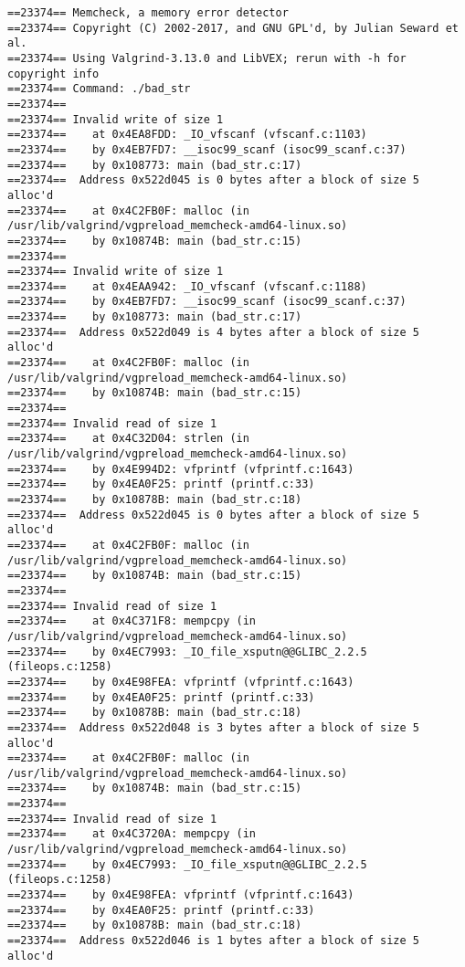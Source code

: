 \documentclass[11pt]{article}
\begin{document}
\begin{verbatim}
==23374== Memcheck, a memory error detector
==23374== Copyright (C) 2002-2017, and GNU GPL'd, by Julian Seward et al.
==23374== Using Valgrind-3.13.0 and LibVEX; rerun with -h for copyright info
==23374== Command: ./bad_str
==23374== 
==23374== Invalid write of size 1
==23374==    at 0x4EA8FDD: _IO_vfscanf (vfscanf.c:1103)
==23374==    by 0x4EB7FD7: __isoc99_scanf (isoc99_scanf.c:37)
==23374==    by 0x108773: main (bad_str.c:17)
==23374==  Address 0x522d045 is 0 bytes after a block of size 5 alloc'd
==23374==    at 0x4C2FB0F: malloc (in /usr/lib/valgrind/vgpreload_memcheck-amd64-linux.so)
==23374==    by 0x10874B: main (bad_str.c:15)
==23374== 
==23374== Invalid write of size 1
==23374==    at 0x4EAA942: _IO_vfscanf (vfscanf.c:1188)
==23374==    by 0x4EB7FD7: __isoc99_scanf (isoc99_scanf.c:37)
==23374==    by 0x108773: main (bad_str.c:17)
==23374==  Address 0x522d049 is 4 bytes after a block of size 5 alloc'd
==23374==    at 0x4C2FB0F: malloc (in /usr/lib/valgrind/vgpreload_memcheck-amd64-linux.so)
==23374==    by 0x10874B: main (bad_str.c:15)
==23374== 
==23374== Invalid read of size 1
==23374==    at 0x4C32D04: strlen (in /usr/lib/valgrind/vgpreload_memcheck-amd64-linux.so)
==23374==    by 0x4E994D2: vfprintf (vfprintf.c:1643)
==23374==    by 0x4EA0F25: printf (printf.c:33)
==23374==    by 0x10878B: main (bad_str.c:18)
==23374==  Address 0x522d045 is 0 bytes after a block of size 5 alloc'd
==23374==    at 0x4C2FB0F: malloc (in /usr/lib/valgrind/vgpreload_memcheck-amd64-linux.so)
==23374==    by 0x10874B: main (bad_str.c:15)
==23374== 
==23374== Invalid read of size 1
==23374==    at 0x4C371F8: mempcpy (in /usr/lib/valgrind/vgpreload_memcheck-amd64-linux.so)
==23374==    by 0x4EC7993: _IO_file_xsputn@@GLIBC_2.2.5 (fileops.c:1258)
==23374==    by 0x4E98FEA: vfprintf (vfprintf.c:1643)
==23374==    by 0x4EA0F25: printf (printf.c:33)
==23374==    by 0x10878B: main (bad_str.c:18)
==23374==  Address 0x522d048 is 3 bytes after a block of size 5 alloc'd
==23374==    at 0x4C2FB0F: malloc (in /usr/lib/valgrind/vgpreload_memcheck-amd64-linux.so)
==23374==    by 0x10874B: main (bad_str.c:15)
==23374== 
==23374== Invalid read of size 1
==23374==    at 0x4C3720A: mempcpy (in /usr/lib/valgrind/vgpreload_memcheck-amd64-linux.so)
==23374==    by 0x4EC7993: _IO_file_xsputn@@GLIBC_2.2.5 (fileops.c:1258)
==23374==    by 0x4E98FEA: vfprintf (vfprintf.c:1643)
==23374==    by 0x4EA0F25: printf (printf.c:33)
==23374==    by 0x10878B: main (bad_str.c:18)
==23374==  Address 0x522d046 is 1 bytes after a block of size 5 alloc'd

\end{verbatim}
\end{document}
